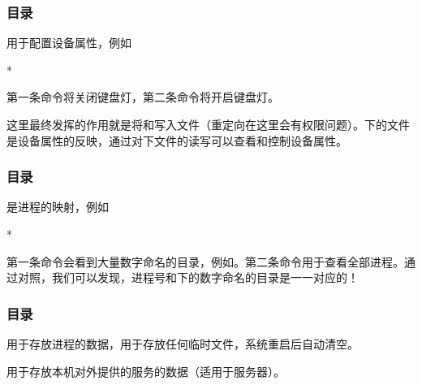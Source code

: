 \begin{frame}
    \frametitle{目录}
    用于配置设备属性，例如
    \begin{Code}*
        
    \end{Code}
    第一条命令将关闭键盘灯，第二条命令将开启键盘灯。
    
    这里最终发挥的作用就是将和写入文件（重定向\code{>}在这里会有权限问题）。下的文件是设备属性的反映，通过对下文件的读写可以查看和控制设备属性。
\end{frame}

\begin{frame}
    \frametitle{目录}
    是进程的映射，例如
    \begin{Code}*
        
    \end{Code}
    第一条命令会看到大量数字命名的目录，例如。第二条命令用于查看全部进程。通过对照，我们可以发现，进程号和下的数字命名的目录是一一对应的！
\end{frame}

\begin{frame}
    \frametitle{目录}
    用于存放进程的数据，用于存放任何临时文件，系统重启后自动清空。 

    用于存放本机对外提供的服务的数据（适用于服务器）。
\end{frame}
